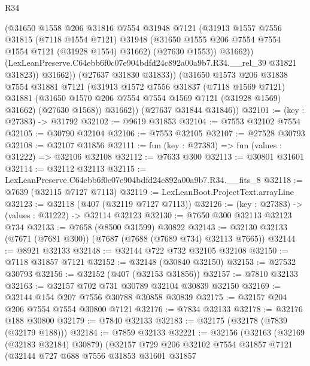 \begin{lexlean}{R34}
\begin{coremodule}
                  (@31650
                    @1558
                    @206
                    @31816
                    @7554
                    @31948
                    @7121
                    (@31913
                      @1557
                      @7556
                      @31815
                      (@7118 @1554 @7121)
                      @31948
                      (@31650 @1555 @206 @7554 @7554 @1554 @7121 (@31928 @1554) @31662)
                      (@27630 @1553))
                    @31662))
                (LexLeanPreserve.C64ebb6f0c07e904bdfd24c892a00a9b7.R34.__rel_39 @31821 @31823))
              @31662))
          (@27637 @31830 @31833))
        (@31650
          @1573
          @206
          @31838
          @7554
          @31881
          @7121
          (@31913
            @1572
            @7556
            @31837
            (@7118 @1569 @7121)
            @31881
            (@31650 @1570 @206 @7554 @7554 @1569 @7121 (@31928 @1569) @31662)
            (@27630 @1568))
          @31662))
      (@27637 @31844 @31846))
@32101 := (key : @27383) -> @31792
@32102 := @9619 @31853
@32104 := @7553 @32102 @7554
@32105 := @30790 @32104
@32106 := @7553 @32105
@32107 := @27528 @30793
@32108 := @32107 @31856
@32111 := fun (key : @27383) => fun (values : @31222) => @32106 @32108
@32112 := @7633 @300
@32113 := @30801 @31601
@32114 := @32112 @32113
@32115 := LexLeanPreserve.C64ebb6f0c07e904bdfd24c892a00a9b7.R34.__fits_8
@32118 := @7639 (@32115 @7127 @7113)
@32119 := LexLeanBoot.ProjectText.arrayLine
@32123 := @32118 (@407 (@32119 @7127 @7113))
@32126 := (key : @27383) -> (values : @31222) -> @32114 @32123
@32130 := @7650 @300 @32113 @32123 @734
@32133 := @7658 (@8500 @31599) @30822
@32143 := @32130 @32133 (@7671 (@7681 @300)) (@7687 (@7688 (@7689 @734) @32113 @7665))
@32144 := @8921 @32133
@32148 := @32144 @722 @732 @32105 @32108
@32150 := @7118 @31857 @7121
@32152 := @32148 (@30840 @32150)
@32153 := @27532 @30793
@32156 := @32152 (@407 (@32153 @31856))
@32157 := @7810 @32133
@32163 := @32157 @702 @731 @30789 @32104 @30839 @32150
@32169 := @32144 @154 @207 @7556 @30788 @30858 @30839
@32175 := @32157 @204 @206 @7554 @7554 @30800 @7121
@32176 := @7834 @32133
@32178 := @32176 @188 @30800
@32179 := @7840 @32133
@32183 := @32175 (@32178 (@7839 (@32179 @188)))
@32184 := @7859 @32133
@32221 := @32156
    (@32163
      (@32169 (@32183 @32184) @30879)
      (@32157
        @729
        @206
        @32102
        @7554
        @31857
        @7121
        (@32144
          @727
          @688
          @7556
          @31853
          @31601
          @31857

\end{coremodule}
\end{lexlean}

